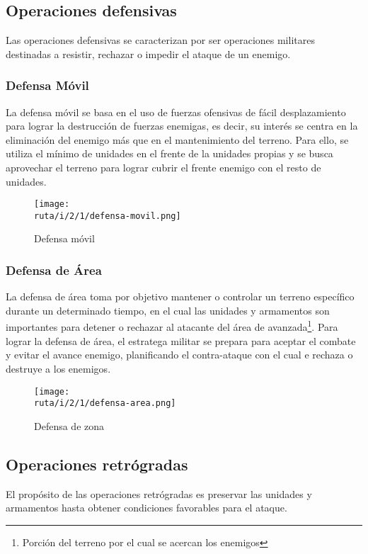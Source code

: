 

\subsection{Operaciones defensivas}
Las operaciones defensivas se caracterizan por ser operaciones militares destinadas a resistir, rechazar o impedir el ataque de un enemigo.


\subsubsection{Defensa Móvil}
La defensa móvil se basa en el uso de fuerzas ofensivas de fácil desplazamiento para lograr la destrucción de fuerzas enemigas, es decir, su interés se centra en la eliminación del enemigo más que en el mantenimiento del terreno. Para ello, se utiliza el mínimo de unidades en el \gls{frente} de la unidades propias y se busca aprovechar el terreno para lograr cubrir el \gls{frente} enemigo con el resto de unidades.
\begin{figure}[H]
 \centering
 \texttt{[image: \\ruta/i/2/1/defensa-movil.png]}
 \caption{Defensa móvil}
 \label{2-1:fig:defensa-movil}
\end{figure}

\subsubsection{Defensa de Área}
La defensa de área toma por objetivo mantener o controlar un terreno específico durante un determinado tiempo, en el cual las unidades y armamentos son importantes para detener o rechazar al atacante del área de avanzada\footnote{Porción del terreno por el cual se acercan los enemigos}. Para lograr la defensa de área, el estratega militar se prepara para aceptar el combate y evitar el avance enemigo, planificando el contra-ataque con el cual e rechaza o destruye a los enemigos.
\begin{figure}[H]
 \centering
 \texttt{[image: \\ruta/i/2/1/defensa-area.png]}
 \caption{Defensa de zona}
 \label{2-1:fig:defensa-zona}
\end{figure}




\subsection{Operaciones retrógradas}
El propósito de las operaciones retrógradas es preservar las unidades y armamentos hasta obtener condiciones favorables para el ataque.

